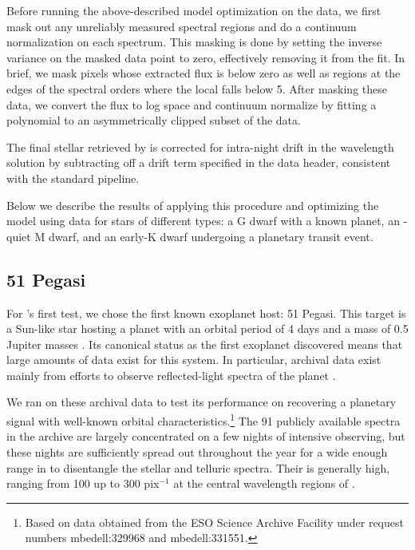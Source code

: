 \documentclass[modern]{aastex62}
\begin{document}
Before running the above-described model optimization on the data, we first mask out any unreliably measured spectral regions and do a continuum normalization on each spectrum.
This masking is done by setting the inverse variance on the masked data point to zero, effectively removing it from the fit.
In brief, we mask pixels whose extracted flux is below zero as well as regions at the edges of the spectral orders where the local \SNR falls below 5.
After masking these data, we convert the flux to log space and continuum normalize by fitting a polynomial to an asymmetrically clipped subset of the data.

The final stellar \RV retrieved by \wobble is corrected for intra-night drift in the wavelength solution by subtracting off a drift term specified in the data header, consistent with the standard \HARPS pipeline. 

Below we describe the results of applying this procedure and optimizing the \wobble model using \HARPS data for stars of different types: a G dwarf with a known planet, an \RV-quiet M dwarf, and an early-K dwarf undergoing a planetary transit event.

\subsection{51 Pegasi}

For \wobble's first test, we chose the first known exoplanet host: 51 Pegasi.
This target is a Sun-like star hosting a planet with an orbital period of 4 days and a mass of 0.5 Jupiter masses \citep{Mayor1995}.
Its canonical status as the first exoplanet discovered means that large amounts of data exist for this system.
In particular, archival \HARPS data exist mainly from efforts to observe reflected-light spectra of the planet \citep{Martins2015}.

We ran \wobble on these archival data to test its performance on recovering a planetary signal with well-known orbital characteristics.\footnote{Based on data obtained from the ESO Science Archive Facility under request numbers mbedell:329968 and mbedell:331551.}
The 91 publicly available spectra in the \HARPS archive are largely concentrated on a few nights of intensive observing, but these nights are sufficiently spread out throughout the year for a wide enough range in \BERV to disentangle the stellar and telluric spectra.
Their \SNR is generally high, ranging from 100 up to 300 pix$^{-1}$ at the central wavelength regions of \HARPS.
\end{document}
